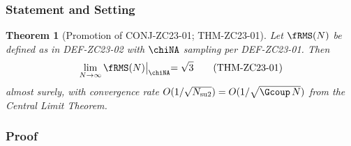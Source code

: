 \documentclass[12pt, a4paper]{article}
\newtheorem{theorem}{Theorem}[section]
\begin{document}
\subsubsection{Statement and Setting}

\begin{theorem}[Promotion of CONJ-ZC23-01; THM-ZC23-01]
\label{thm:zc23-01}
Let $\fRMS(N)$ be defined as in DEF-ZC23-02 with $\chiNA$
sampling per DEF-ZC23-01. Then
\begin{equation}
  \lim_{N\to\infty} \fRMS(N)\bigl|_{\chiNA} = \sqrt{3}
  \tag{THM-ZC23-01}\label{eq:thm-zc23-01}
\end{equation}
almost surely, with convergence rate $O(1/\sqrt{N_{\rm su2}})
= O(1/\sqrt{\Gcoup\,N})$ from the Central Limit Theorem.
\end{theorem}

\subsubsection{Proof}
\end{document}
